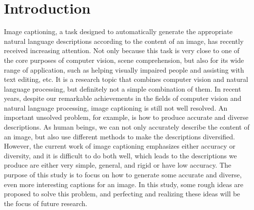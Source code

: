\documentclass[12pt]{article}
\begin{document}
	\section{Introduction}
	Image captioning, a task designed to automatically generate the appropriate natural language descriptions according to the content of an image, has recently received increasing attention. Not only because this task is very close to one of the core purposes of computer vision, scene comprehension, but also for its wide range of application, such as helping visually impaired people and assisting with text editing, etc.
	It is a research topic that combines computer vision and natural language processing, but definitely not a simple combination of them. In recent years, despite our remarkable achievements in the fields of computer vision and natural language processing, image captioning is still not well resolved. An important unsolved problem, for example, is how to produce accurate and diverse descriptions. As human beings, we can not only accurately describe the content of an image, but also use different methods to make the descriptions diversified. However, the current work of image captioning emphasizes either accuracy or diversity, and it is difficult to do both well, which leads to the descriptions we produce are either very simple, general, and rigid or have low accuracy.
	The purpose of this study is to focus on how to generate some accurate and diverse, even more interesting captions for an image. In this study, some rough ideas are proposed to solve this problem, and perfecting and realizing these ideas will be the focus of future research.
	
\end{document}
